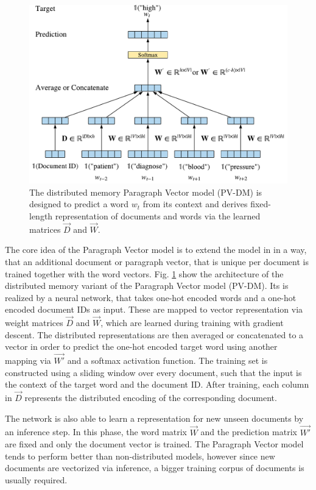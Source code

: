 \begin{figure}[!htbp]
	\centering
	\includegraphics[width=\textwidth]{figures/paragraph-vector}
	\caption{The distributed memory Paragraph Vector model (PV-DM) is designed to predict a word $w_t$ from its context and derives fixed-length representation of documents and words via the learned matrices $\vec{D}$ and $\vec{W}$.}
	\label{fig:paragraph-vector}
\end{figure}

The core idea of the Paragraph Vector model is to extend the model in \cite{DBLP:journals/jmlr/BengioDVJ03} in a way, that an additional document or paragraph vector, that is unique per document is trained together with the word vectors.
Fig. \ref{fig:paragraph-vector} show the architecture of the distributed memory variant of the Paragraph Vector model (PV-DM).
Its is realized by a neural network, that takes one-hot encoded words and a one-hot encoded document IDs as input.
These are mapped to vector representation via weight matrices $\vec{D}$ and $\vec{W}$, which are learned during training with gradient descent.
The distributed representations are then averaged or concatenated to a vector in order to predict the one-hot encoded target word using another mapping via $\vec{W'}$ and a softmax activation function.
The training set is constructed using a sliding window over every document, such that the input is the context of the target word and the document ID.
After training, each column in $\vec{D}$ represents the distributed encoding of the corresponding document.

The network is also able to learn a representation for new unseen documents by an inference step.
In this phase, the word matrix $\vec{W}$ and the prediction matrix $\vec{W'}$ are fixed and only the document vector is trained.
The Paragraph Vector model tends to perform better than non-distributed models, however since new documents are vectorized via inference, a bigger training corpus of documents is usually required.

